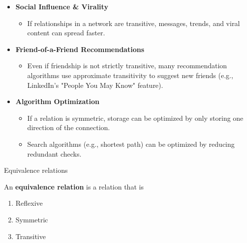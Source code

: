 \documentclass[10pt]{beamer}
\begin{document}
\begin{frame}

\begin{mygreenbox}[title=Why do relations matter?: Some examples from social networks]

\begin{itemize}
\item \textbf{Social Influence \& Virality}

\begin{itemize}
\item If relationships in a network are \alert{transitive}, messages, trends, and viral content can spread faster.
\end{itemize}

\item \textbf{Friend-of-a-Friend Recommendations}  
\begin{itemize}
\item Even if friendship is not strictly \alert{transitive}, many recommendation algorithms use approximate transitivity to suggest new friends (e.g., LinkedIn’s "People You May Know" feature).
\end{itemize}


\item \textbf{Algorithm Optimization}
\begin{itemize}
\item If a relation is \alert{symmetric}, storage can be optimized by only storing one direction of the connection.
\item Search algorithms (e.g., shortest path) can be optimized by reducing redundant checks.
\end{itemize}
\end{itemize}
\end{mygreenbox}

\end{frame}

\begin{frame}{Equivalence relations}
\begin{myredbox}[title=Definition]
An \textbf{equivalence relation} is a relation that is
\begin{enumerate}
\item Reflexive \greencheck
\item Symmetric \greencheck
\item Transitive \greencheck
\end{enumerate}
\end{myredbox}

\end{frame}
\end{document}

